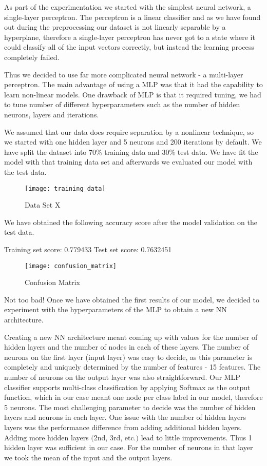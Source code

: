 \documentclass[journal]{IEEEtran}
\begin{document}
As part of the experimentation we started with the simplest neural network, a single-layer perceptron. The perceptron is a linear classifier and as we have found out during the preprocessing our dataset is not linearly separable by a hyperplane, therefore a single-layer perceptron has never got to a state where it could classify all of the input vectors correctly, but instead the learning process completely failed.

Thus we decided to use far more complicated neural network - a multi-layer perceptron. The main advantage of using a MLP was that it had the capability to learn non-linear models. One drawback of MLP is that it required tuning, we had to tune number of different hyperparameters such as the number of hidden neurons, layers and iterations.

We assumed that our data does require separation by a nonlinear technique, so we started with one hidden layer and 5 neurons and 200 iterations by default. We have split the dataset  into 70\% training data and 30\% test data.  We have fit the model with that training data set and afterwards we evaluated our model with the test data.

\begin{figure}[ht]
\centering
\texttt{[image: training\_data]}
\caption{Data Set X}
\label{fig:data_set_x}
\end{figure}

We have obtained the following accuracy score after the model validation on the test data.

Training set score: 0.779433
Test set score: 0.7632451

\begin{figure}[ht]
\centering
\texttt{[image: confusion\_matrix]}
\caption{Confusion Matrix}
\label{fig:confusion_matrix}
\end{figure}

Not too bad! Once we have obtained the first results of our model, we decided to experiment with the hyperparameters of the MLP to obtain a new NN architecture.

Creating a new NN architecture meant coming up with values for the number of hidden layers and the number of nodes in each of these layers. The number of neurons on the first layer (input layer) was easy to decide, as this parameter is completely and uniquely determined by the number of features - 15 features.  The number of neurons on the output layer was also straightforward. Our MLP classifier supports multi-class classification by applying Softmax as the output function, which in our case meant one node per class label in our model, therefore 5 neurons. The most challenging parameter to decide was the number of hidden layers and neurons in each layer. One issue with the number of hidden layers layers was the performance difference from adding additional hidden layers. Adding more hidden layers $($2nd, 3rd, etc.$)$ lead to little improvements. Thus 1 hidden layer was sufficient in our case. For the number of neurons in that layer we took the mean of the input and the output layers.
\end{document}
